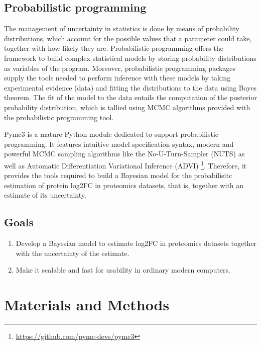 \documentclass[11pt, a4paper]{report}
\begin{document}
\subsection{Probabilistic programming}

The management of uncertainty in statistics is done by means of probability distributions, which account for the possible values that a parameter could take, together with how likely they are. Probabilistic programming offers the framework to build complex statistical models by storing probability distributions as variables of the program. Moreover, probabilistic programming packages supply the tools needed to perform inference with these models by taking experimental evidence (data) and fitting the distributions to the data using Bayes theorem. The fit of the model to the data entails the computation of the posterior probability distribution, which is tallied using \ac{MCMC} algorithms provided with the probabilistic programming tool.

Pymc3 is a mature Python module dedicated to support probabilistic programming. It features   intuitive model specification syntax, modern and powerful \ac{MCMC} sampling algorithms like the No-U-Turn-Sampler (\ac{NUTS}) as well as Automatic Differentiation Variational Inference (\ac{ADVI}) \footnote{\href{https://github.com/pymc-devs/pymc3}{https://github.com/pymc-devs/pymc3}}. Therefore, it provides the tools required to build a Bayesian model for the probabilisitc estimation of protein \ac{log2FC} in proteomics datasets, that is, together with an estimate of its uncertainty.

\subsection{Goals}

\begin{enumerate}

\item Develop a Bayesian model to estimate log2FC in proteomics datasets together with the uncertainty of the estimate.

\item Make it scalable and fast for usability in ordinary modern computers.

\end{enumerate}

\section{Materials and Methods}
\end{document}
